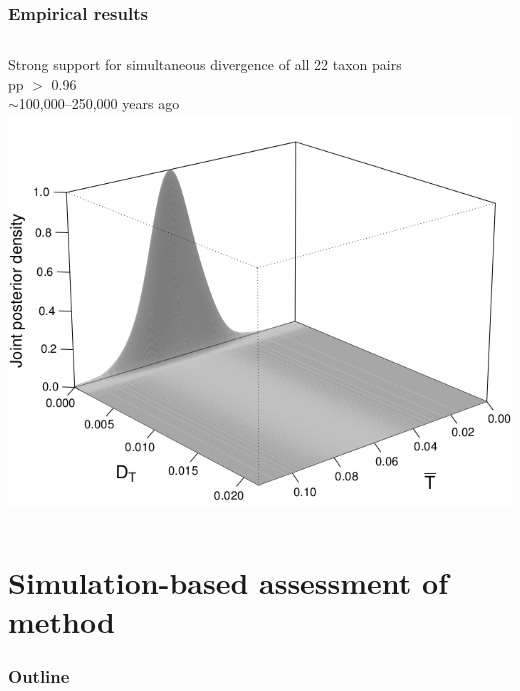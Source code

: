 \begin{frame}
    \frametitle{Empirical results}
    \begin{columns}[c]
            {\small
            Strong support for simultaneous divergence of all 22 taxon pairs \\
            \vspace{1cm}
            pp $>$ 0.96 \\
            \vspace{1cm}
            $\sim$100,000--250,000 years ago}
        \includegraphics[width=\textwidth]{images/jointDensityPlotsSlide.jpg}
    \end{columns}
\end{frame}

\section{Simulation-based assessment of method}

\begin{frame}
\frametitle{Outline}
\end{frame}

